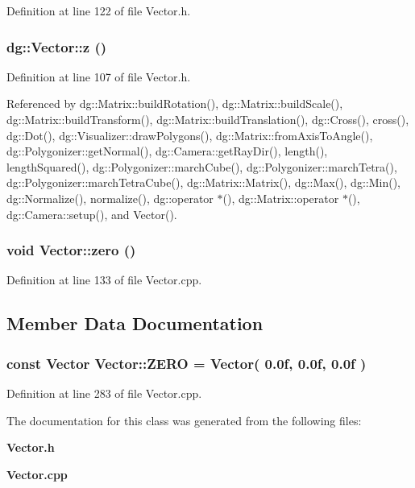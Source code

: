 Definition at line 122 of file Vector.h.
\subsubsection{ dg::Vector::z ()\hspace{0.3cm}{\tt  [inline]}}\label{classdg_1_1Vector_a4}




Definition at line 107 of file Vector.h.

Referenced by dg::Matrix::build\-Rotation(), dg::Matrix::build\-Scale(), dg::Matrix::build\-Transform(), dg::Matrix::build\-Translation(), dg::Cross(), cross(), dg::Dot(), dg::Visualizer::draw\-Polygons(), dg::Matrix::from\-Axis\-To\-Angle(), dg::Polygonizer::get\-Normal(), dg::Camera::get\-Ray\-Dir(), length(), length\-Squared(), dg::Polygonizer::march\-Cube(), dg::Polygonizer::march\-Tetra(), dg::Polygonizer::march\-Tetra\-Cube(), dg::Matrix::Matrix(), dg::Max(), dg::Min(), dg::Normalize(), normalize(), dg::operator $\ast$(), dg::Matrix::operator $\ast$(), dg::Camera::setup(), and Vector().
\subsubsection{\setlength{\rightskip}{0pt plus 5cm}void Vector::zero ()}\label{classdg_1_1Vector_a30}




Definition at line 133 of file Vector.cpp.

\subsection{Member Data Documentation}
\subsubsection{\setlength{\rightskip}{0pt plus 5cm}const Vector Vector::ZERO = Vector( 0.0f, 0.0f, 0.0f )\hspace{0.3cm}{\tt  [static]}}\label{classdg_1_1Vector_p0}




Definition at line 283 of file Vector.cpp.

The documentation for this class was generated from the following files:\begin{CompactItemize}
\item 
{\bf Vector.h}\item 
{\bf Vector.cpp}\end{CompactItemize}
